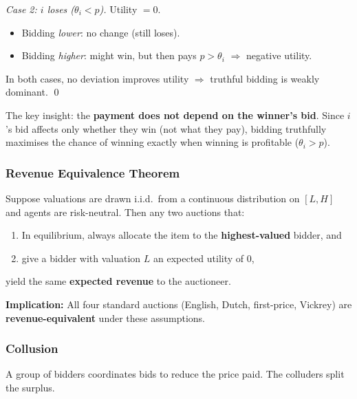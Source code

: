 \emph{Case 2: $i$ loses ($\theta_i < p$).} Utility $= 0$.
\begin{itemize}
  \item Bidding \emph{lower}: no change (still loses).
  \item Bidding \emph{higher}: might win, but then pays $p > \theta_i$ $\Rightarrow$ negative utility.
\end{itemize}

In both cases, no deviation improves utility $\Rightarrow$ truthful bidding is weakly dominant. \qed

\begin{tipbox}
The key insight: the \textbf{payment does not depend on the winner's bid}. Since $i$'s bid affects only whether they win (not what they pay), bidding truthfully maximises the chance of winning exactly when winning is profitable ($\theta_i > p$).
\end{tipbox}

\separator

\subsubsection{Revenue Equivalence Theorem}

\begin{thmbox}
Suppose valuations are drawn i.i.d.\ from a continuous distribution on $[L, H]$ and agents are risk-neutral. Then any two auctions that:
\begin{enumerate}
  \item In equilibrium, always allocate the item to the \textbf{highest-valued} bidder, and
  \item give a bidder with valuation $L$ an expected utility of $0$,
\end{enumerate}
yield the same \textbf{expected revenue} to the auctioneer.
\end{thmbox}

\textbf{Implication:} All four standard auctions (English, Dutch, first-price, Vickrey) are \textbf{revenue-equivalent} under these assumptions.

\separator

\subsubsection{Collusion}

\begin{defbox}[Collusion]
A group of bidders coordinates bids to reduce the price paid. The colluders split the surplus.
\end{defbox}

